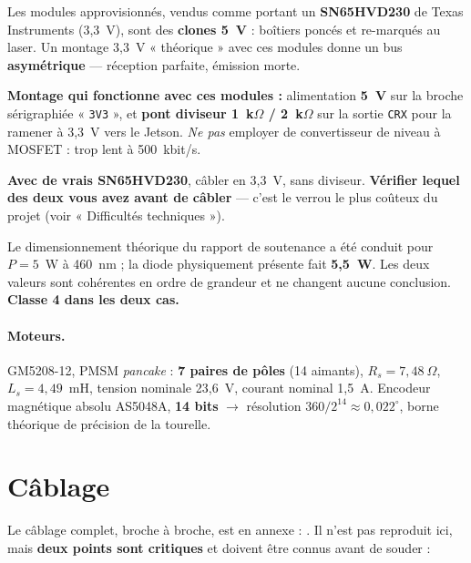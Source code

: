 \documentclass[11pt,a4paper]{article}
\begin{document}
\begin{avertissement}
Les modules  approvisionnés, vendus comme portant un \textbf{SN65HVD230}
de Texas Instruments (3,3~V), sont des \textbf{clones 5~V} : boîtiers poncés et re-marqués au
laser. Un montage 3,3~V « théorique » avec ces modules donne un bus \textbf{asymétrique} —
réception parfaite, émission morte.

\textbf{Montage qui fonctionne avec ces modules :} alimentation \textbf{5~V} sur la broche
sérigraphiée « \texttt{3V3} », et \textbf{pont diviseur 1~k$\Omega$ / 2~k$\Omega$} sur la
sortie \texttt{CRX} pour la ramener à 3,3~V vers le Jetson. \emph{Ne pas} employer de
convertisseur de niveau à MOSFET : trop lent à 500~kbit/s.

\textbf{Avec de vrais SN65HVD230}, câbler en 3,3~V, sans diviseur. \textbf{Vérifier lequel
des deux vous avez avant de câbler} — c'est le verrou le plus coûteux du projet
(voir « Difficultés techniques »).
\end{avertissement}

\begin{note}
Le dimensionnement théorique du rapport de soutenance a été conduit pour $P = 5$~W à 460~nm ;
la diode physiquement présente fait \textbf{5,5~W}. Les deux valeurs sont cohérentes en ordre
de grandeur et ne changent aucune conclusion. \textbf{Classe 4 dans les deux cas.}
\end{note}

\paragraph{Moteurs.} GM5208-12, PMSM \emph{pancake} : \textbf{7 paires de pôles}
(14 aimants), $R_s = 7{,}48~\Omega$, $L_s = 4{,}49$~mH, tension nominale 23,6~V, courant
nominal 1,5~A. Encodeur magnétique absolu AS5048A, \textbf{14 bits} $\rightarrow$ résolution
$360/2^{14} \approx 0{,}022^\circ$, borne théorique de précision de la tourelle.

\section{Câblage}

Le câblage complet, broche à broche, est en annexe :
\textbf{}. Il n'est pas reproduit ici, mais
\textbf{deux points sont critiques} et doivent être connus avant de souder :
\end{document}
